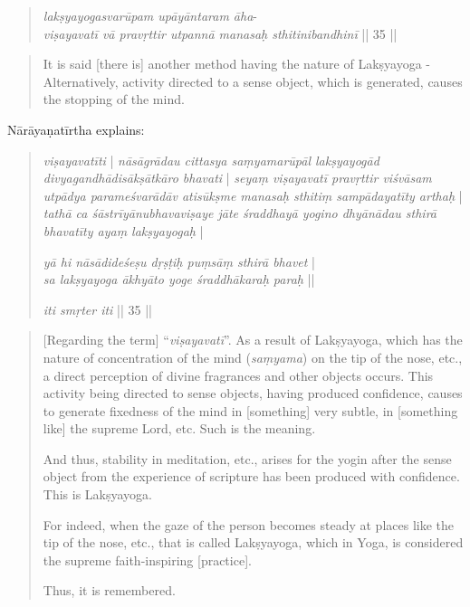 \begin{quote}
  \textit{lakṣyayogasvarūpam upāyāntaram āha}-\\
  \textit{viṣayavatī vā pravṛttir utpannā manasaḥ sthitinibandhinī} || 35 ||
\end{quote}
\begin{quote}
It is said [there is] another method having the nature of Lakṣyayoga - \\
Alternatively, activity directed to a sense object, which is generated, causes the stopping of the mind.  
\end{quote}

Nārāyaṇatīrtha explains:

\begin{quote}
  \textit{viṣayavatīti} | \textit{nāsāgrādau cittasya saṃyamarūpāl lakṣyayogād divyagandhādisākṣātkāro bhavati} | \textit{seyaṃ viṣayavatī pravṛttir viśvāsam utpādya parameśvarādāv atisūkṣme manasaḥ sthitiṃ sampādayatīty arthaḥ} | \textit{tathā ca śāstrīyānubhavaviṣaye jāte śraddhayā yogino dhyānādau sthirā bhavatīty ayaṃ lakṣyayogaḥ} |

  \textit{yā hi nāsādideśeṣu dṛṣṭiḥ puṃsāṃ sthirā bhavet} |\\
  \textit{sa lakṣyayoga ākhyāto yoge śraddhākaraḥ paraḥ} ||
  
\textit{iti smṛter iti} || 35 ||
\end{quote}
\begin{quote}
  [Regarding the term] ``\textit{viṣayavatī}''. As a result of Lakṣyayoga, which has the nature of concentration of the mind (\textit{saṃyama}) on the tip of the nose, etc., a direct perception of divine fragrances and other objects occurs. This activity being directed to sense objects, having produced confidence, causes to generate fixedness of the mind in [something] very subtle, in [something like] the supreme Lord, etc. Such is the meaning.
  
  And thus, stability in meditation, etc., arises for the yogin after the sense object from the experience of scripture has been produced with confidence. This is Lakṣyayoga.
  
  For indeed, when the gaze of the person becomes steady at places like the tip of the nose, etc., that is called Lakṣyayoga, which in Yoga, is considered the supreme faith-inspiring [practice].

  Thus, it is remembered.
  \end{quote}

